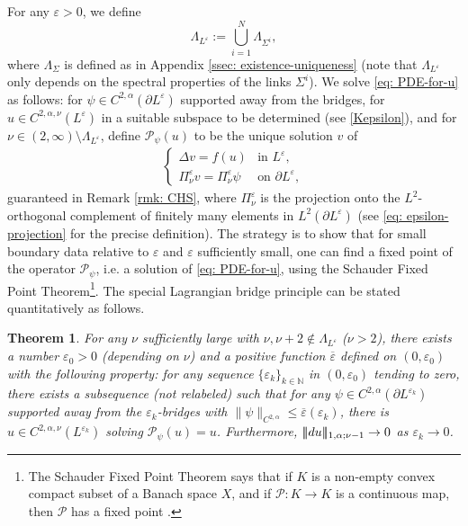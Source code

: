 \documentclass[11pt]{amsart}
\DeclarePairedDelimiter{\tnorm}{\vert\!\vert\!\vert}{\vert\!\vert\!\vert}
\newtheorem{theorem}{Theorem}
\theoremstyle{definition}
\theoremstyle{remark}
\begin{document}
For any $\varepsilon > 0$, we define \[\Lambda_{L^\varepsilon} := \bigcup_{i = 1}^N \Lambda_{\Sigma^i}, \]
where $\Lambda_{\Sigma}$ is defined as in Appendix \ref{ssec: existence-uniqueness} (note that $\Lambda_{L^\varepsilon}$ only depends on the spectral properties of the links $\Sigma^i$). We solve \eqref{eq: PDE-for-u} as follows: for $\psi\in C^{2,\alpha}(\partial L^\varepsilon)$ supported away from the bridges, for $u\in C^{2,\alpha, \nu}(L^\varepsilon)$ in a suitable subspace to be determined (see \eqref{Kepsilon}), and for $\nu \in (2,\infty) \setminus \Lambda_{L^\varepsilon}$, define $\mathcal{P}_\psi(u)$ to be the unique solution $v$ of
\begin{align}
\begin{cases}
    \Delta v=f(u) & \text{in } L^\varepsilon,\\
    \Pi_\nu^\varepsilon v=\Pi_\nu^\varepsilon\psi & \text{on } \partial L^\varepsilon, \label{dp}
\end{cases}
\end{align}
guaranteed in Remark \ref{rmk: CHS}, where $\Pi^\varepsilon_\nu$ is the projection onto the $L^2$-orthogonal complement of finitely many elements in $L^2(\partial L^\varepsilon)$ (see \eqref{eq: epsilon-projection} for the precise definition).
The strategy is to show that for small boundary data relative to $\varepsilon$ and $\varepsilon$ sufficiently small, one can find a fixed point of the operator $\mathcal{P}_\psi$, i.e. a solution of \eqref{eq: PDE-for-u}, using the Schauder Fixed Point Theorem\footnote{The Schauder Fixed Point Theorem says that if $K$ is a non-empty convex compact subset of a Banach space $X$, and if $\mathcal{P} : K \rightarrow K$ is a
continuous map, then $\mathcal{P}$ has a fixed point \cite[Theorem 11.1]{GT01}.}. The special Lagrangian bridge principle can be stated quantitatively as follows.
\begin{theorem}\label{bridgeprinciple}
For any $\nu$ sufficiently large with $\nu, \nu+2\notin \Lambda_{L^\varepsilon}$ ($\nu > 2$), there exists a number $\varepsilon_0 > 0$ (depending on $\nu$) and a positive function $\overline{\varepsilon}$ defined on $(0, \varepsilon_0)$ with the following property: for any sequence $\{\varepsilon_k\}_{k\in \mathbb{N}}$ in $(0,\varepsilon_0)$ tending to zero, there exists a subsequence (not relabeled) such that for any $\psi \in C^{2,\alpha}(\partial L^{\varepsilon_k})$ supported away from the $\varepsilon_k$-bridges with $\|\psi\|_{C^{2,\alpha}} \leq \overline{\varepsilon}(\varepsilon_k)$, there is $u \in C^{2,\alpha,\nu}(L^{\varepsilon_k})$ solving $\mathcal{P}_\psi(u)=u$. Furthermore, $\tnorm{du}_{1,\alpha;\nu-1} \rightarrow 0$ as $\varepsilon_k \rightarrow 0$.
\end{theorem}
\end{document}
